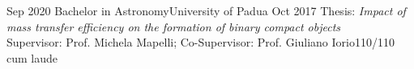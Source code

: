 \begin{experiences}
    {Sep 2020}   {Bachelor in Astronomy}{University of Padua}
    {Oct 2017} 
    {Thesis: \textit{Impact of mass transfer efficiency on the formation of binary compact objects} \\
    Supervisor: Prof. Michela Mapelli; Co-Supervisor: Prof. Giuliano Iorio}{110/110 cum laude}
   {}%
\end{experiences}
